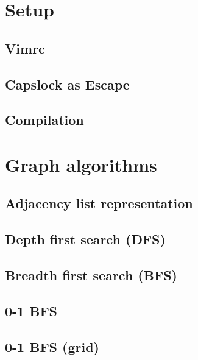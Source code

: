 \section{Setup}
\subsection{Vimrc}
\raggedbottom
\hrulefill
\subsection{Capslock as Escape}
\raggedbottom
\hrulefill
\subsection{Compilation}
\raggedbottom
\hrulefill


\section{Graph algorithms}
\subsection{Adjacency list representation}
\raggedbottom
\hrulefill
\subsection{Depth first search (DFS)}
\raggedbottom
\hrulefill
\subsection{Breadth first search (BFS)}
\raggedbottom
\hrulefill
\subsection{0-1 BFS}
\raggedbottom
\hrulefill
\subsection{0-1 BFS (grid)}
\raggedbottom
\hrulefill
